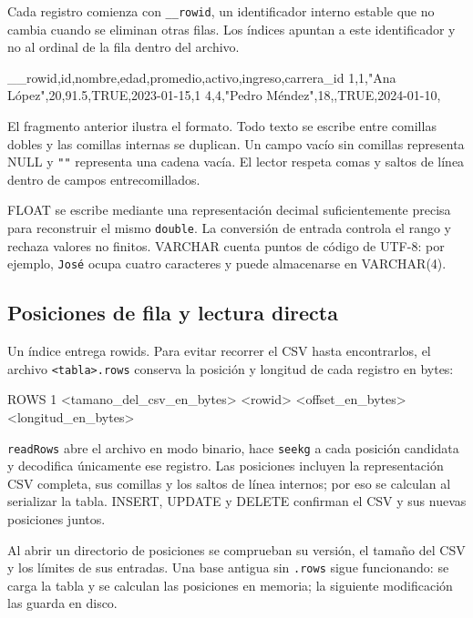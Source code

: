 \documentclass[11pt,a4paper]{article}
\begin{document}
Cada registro comienza con \texttt{\_\_rowid}, un identificador interno
estable que no cambia cuando se eliminan otras filas. Los índices apuntan
a este identificador y no al ordinal de la fila dentro del archivo.

\begin{archivo}
__rowid,id,nombre,edad,promedio,activo,ingreso,carrera_id
1,1,"Ana López",20,91.5,TRUE,2023-01-15,1
4,4,"Pedro Méndez",18,,TRUE,2024-01-10,
\end{archivo}

El fragmento anterior ilustra el formato. Todo texto se escribe entre
comillas dobles y las comillas
internas se duplican. Un campo vacío sin comillas representa NULL y
\texttt{""} representa una cadena vacía. El lector respeta comas y saltos
de línea dentro de campos entrecomillados.

FLOAT se escribe mediante una representación decimal suficientemente
precisa para reconstruir el mismo \texttt{double}. La conversión de
entrada controla el rango y rechaza valores no finitos. VARCHAR cuenta
puntos de código de UTF-8: por ejemplo, \texttt{José} ocupa cuatro
caracteres y puede almacenarse en VARCHAR(4).

\subsection{Posiciones de fila y lectura directa}

Un índice entrega rowids. Para evitar recorrer el CSV hasta encontrarlos,
el archivo \texttt{<tabla>.rows} conserva la posición y longitud de cada
registro en bytes:

\begin{archivo}
ROWS 1 <tamano_del_csv_en_bytes>
<rowid> <offset_en_bytes> <longitud_en_bytes>
\end{archivo}

\texttt{readRows} abre el archivo en modo binario, hace \texttt{seekg} a
cada posición candidata y decodifica únicamente ese registro. Las
posiciones incluyen la representación CSV completa, sus comillas y los
saltos de línea internos; por eso se calculan al serializar la tabla.
INSERT, UPDATE y DELETE confirman el CSV y sus nuevas posiciones juntos.

Al abrir un directorio de posiciones se comprueban su versión, el tamaño
del CSV y los límites de sus entradas. Una base antigua sin \texttt{.rows}
sigue funcionando: se carga la tabla y se calculan las posiciones en
memoria; la siguiente modificación las guarda en disco.
\end{document}
